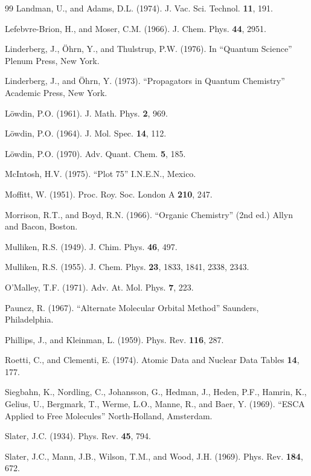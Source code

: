 \documentclass[12pt,letterpaper]{report}
\begin{document}
\begin{thebibliography}{99}
 Landman, U., and Adams, D.L. (1974). J. Vac. Sci. Technol. \textbf{11}, 191.

 Lefebvre-Brion, H., and Moser, C.M. (1966). J. Chem. Phys. \textbf{44}, 2951.

 Linderberg, J., Öhrn, Y., and Thulstrup, P.W. (1976). In ``Quantum Science'' Plenum Press, New York.

 Linderberg, J., and Öhrn, Y. (1973). ``Propagators in Quantum Chemistry'' Academic Press, New York.

 Löwdin, P.O. (1961). J. Math. Phys. \textbf{2}, 969.

 Löwdin, P.O. (1964). J. Mol. Spec. \textbf{14}, 112.

 Löwdin, P.O. (1970). Adv. Quant. Chem. \textbf{5}, 185.

 McIntosh, H.V. (1975). ``Plot 75'' I.N.E.N., Mexico.

 Moffitt, W. (1951). Proc. Roy. Soc. London A \textbf{210}, 247.

 Morrison, R.T., and Boyd, R.N. (1966). ``Organic Chemistry'' (2nd ed.) Allyn and Bacon, Boston.

 Mulliken, R.S. (1949). J. Chim. Phys. \textbf{46}, 497.

 Mulliken, R.S. (1955). J. Chem. Phys. \textbf{23}, 1833, 1841, 2338, 2343.

 O'Malley, T.F. (1971). Adv. At. Mol. Phys. \textbf{7}, 223.

 Pauncz, R. (1967). ``Alternate Molecular Orbital Method'' Saunders, Philadelphia.

 Phillips, J., and Kleinman, L. (1959). Phys. Rev. \textbf{116}, 287.

 Roetti, C., and Clementi, E. (1974). Atomic Data and Nuclear Data Tables \textbf{14}, 177.

 Siegbahn, K., Nordling, C., Johansson, G., Hedman, J., Heden, P.F., Hamrin, K., Gelius, U., Bergmark, T., Werme, L.O., Manne, R., and Baer, Y. (1969). ``ESCA Applied to Free Molecules'' North-Holland, Amsterdam.

 Slater, J.C. (1934). Phys. Rev. \textbf{45}, 794.

 Slater, J.C., Mann, J.B., Wilson, T.M., and Wood, J.H. (1969). Phys. Rev. \textbf{184}, 672.


\end{thebibliography}
\end{document}
